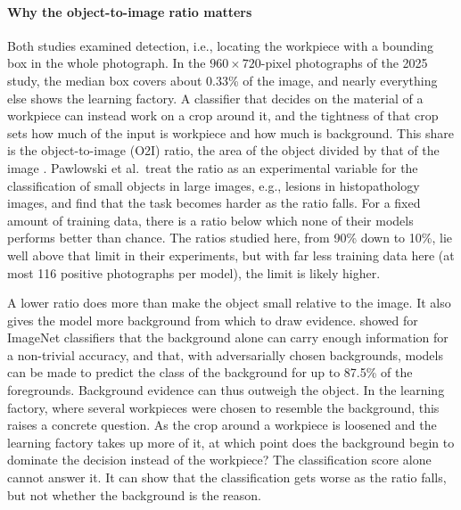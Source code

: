 \paragraph{Why the object-to-image ratio matters}
Both studies examined detection, i.e., locating the workpiece with a bounding box in the
whole photograph. In the $960 \times 720$-pixel photographs of the 2025 study, the median
box covers about 0.33\% of the image, and nearly everything else shows the learning
factory. A classifier that decides on the material of a workpiece can instead work on a
crop around it, and the tightness of that crop sets how much of the input is workpiece
and how much is background. This share is the object-to-image (O2I) ratio, the area of
the object divided by that of the image \citep{pawlowski2019needles}. Pawlowski et al.\ treat the ratio as an experimental variable for
the classification of small objects in large images, e.g., lesions in histopathology
images, and find that the task becomes harder as the ratio falls. For a fixed amount of
training data, there is a ratio below which none of their models performs better than
chance. The ratios studied here, from 90\% down to 10\%, lie well above that limit in their
experiments, but with far less training data here (at most 116 positive photographs per
model), the limit is likely higher.

A lower ratio does more than make the object small relative to the image. It also gives
the model more background from which to draw evidence. \citet{xiao2021noise} showed for ImageNet classifiers that the background alone can
carry enough information for a non-trivial accuracy, and that, with adversarially chosen
backgrounds, models can be made to predict the class of the background for up to 87.5\%
of the foregrounds. Background
evidence can thus outweigh the object. In the learning factory, where several workpieces
were chosen to resemble the background, this raises a concrete question. As the crop
around a workpiece is loosened and the learning factory takes up more of it, at which
point does the background begin to dominate the decision instead of the workpiece? The
classification score alone cannot answer it. It can show that the classification gets
worse as the ratio falls, but not whether the background is the reason.


